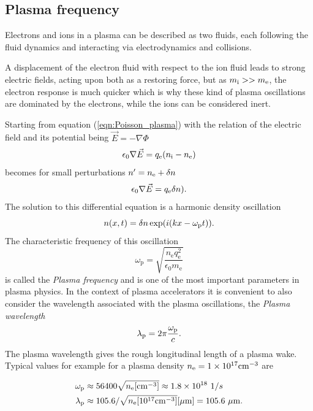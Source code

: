 \subsection*{Plasma frequency}

Electrons and ions in a plasma can be described as two fluids, each following the fluid dynamics and interacting via electrodynamics and collisions.

A displacement of the electron fluid with respect to the ion fluid leads to strong electric fields, acting upon both as a restoring force, but as $m_\mathrm{i}>>m_\mathrm{e}$, the electron response is much quicker which is why these kind of plasma oscillations are dominated by the electrons, while the ions can be considered inert.

Starting from equation (\ref{eqn:Poisson_plasma}) with the relation of the electric field and its potential being $\vec{E}=-\nabla \Phi$ 
\begin{equation}
\epsilon_0 \nabla \vec{E}=q_\mathrm{e} (n_\mathrm{i}-n_\mathrm{e})
\end{equation}
becomes for small perturbations $n'=n_\mathrm{e}+\delta n$
\begin{equation}
\epsilon_0 \nabla \vec{E}=q_\mathrm{e} \delta n).
\end{equation}
The solution to this differential equation is a harmonic density oscillation 
\begin{equation}
n(x,t)=\delta n \exp(i(kx-\omega_\mathrm{p} t)).
\end{equation}
The characteristic frequency of this oscillation 
\begin{equation}
\omega_\mathrm{p}=\sqrt{\frac{n_\mathrm{e}q_\mathrm{e}^2}{\epsilon_0 m_\mathrm{e}}}
\end{equation}
is called the \textit{Plasma frequency} and is one of the most important parameters in plasma physics. 
In the context of plasma accelerators it is convenient to also consider the wavelength associated with the plasma oscillations, 
the \textit{Plasma wavelength}
\begin{equation}
\lambda_\mathrm{p}=2\pi\frac{\omega_\mathrm{p}}{c}.
\end{equation}
The plasma wavelength gives the rough longitudinal length of a plasma wake.
Typical values for example for a plasma density $n_\mathrm{e}=1\times10^{17}\mathrm{cm}^{-3}$ are

\begin{align*}
\omega_\mathrm{p} &\approx 56400 \sqrt{n_\mathrm{e} [\mathrm{cm}^{-3}]} \approx 1.8\times10^{18}\ 1/s\\
\lambda_\mathrm{p} & \approx 105.6 /\sqrt{n_\mathrm{e} [10^{17} \mathrm{cm}^{-3} ]} [\mu\mathrm{m}] = 105.6\ \mu\mathrm{m}.
\end{align*} 


